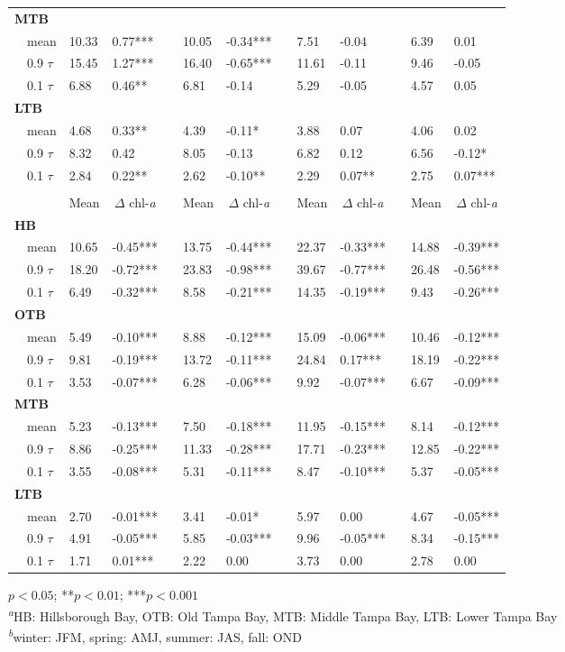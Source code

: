 \documentclass{svjour3}\usepackage[]{graphicx}\usepackage[]{color}
\begin{document}
\begin{table}[!tbp]
\begin{center}
\begin{tabular}{lllcllcllcll}
\hline
{\bfseries MTB}&&&&&&&&&&&\tabularnewline
~~mean&10.33& 0.77***&&10.05&-0.34***&& 7.51&-0.04 && 6.39& 0.01 \tabularnewline
~~0.9 $\tau$&15.45& 1.27***&&16.40&-0.65***&&11.61&-0.11 && 9.46&-0.05 \tabularnewline
~~0.1 $\tau$& 6.88& 0.46**&& 6.81&-0.14 && 5.29&-0.05 && 4.57& 0.05 \tabularnewline
\hline
{\bfseries LTB}&&&&&&&&&&&\tabularnewline
~~mean& 4.68& 0.33**&& 4.39&-0.11*&& 3.88& 0.07 && 4.06& 0.02 \tabularnewline
~~0.9 $\tau$& 8.32& 0.42 && 8.05&-0.13 && 6.82& 0.12 && 6.56&-0.12*\tabularnewline
~~0.1 $\tau$& 2.84& 0.22**&& 2.62&-0.10**&& 2.29& 0.07**&& 2.75& 0.07***\tabularnewline
\hline
{\bfseries }&&&&&&&&&&&\tabularnewline
\cline{2-3} \cline{5-6} \cline{8-9} \cline{11-12}
\multicolumn{1}{l}{}&\multicolumn{1}{c}{Mean}&\multicolumn{1}{c}{$\Delta$ chl-\textit{a}}&\multicolumn{1}{c}{}&\multicolumn{1}{c}{Mean}&\multicolumn{1}{c}{$\Delta$ chl-\textit{a}}&\multicolumn{1}{c}{}&\multicolumn{1}{c}{Mean}&\multicolumn{1}{c}{$\Delta$ chl-\textit{a}}&\multicolumn{1}{c}{}&\multicolumn{1}{c}{Mean}&\multicolumn{1}{c}{$\Delta$ chl-\textit{a}}\tabularnewline
\hline
{\bfseries HB}&&&&&&&&&&&\tabularnewline
~~mean&10.65&-0.45***&&13.75&-0.44***&&22.37&-0.33***&&14.88&-0.39***\tabularnewline
~~0.9 $\tau$&18.20&-0.72***&&23.83&-0.98***&&39.67&-0.77***&&26.48&-0.56***\tabularnewline
~~0.1 $\tau$& 6.49&-0.32***&& 8.58&-0.21***&&14.35&-0.19***&& 9.43&-0.26***\tabularnewline
\hline
{\bfseries OTB}&&&&&&&&&&&\tabularnewline
~~mean& 5.49&-0.10***&& 8.88&-0.12***&&15.09&-0.06***&&10.46&-0.12***\tabularnewline
~~0.9 $\tau$& 9.81&-0.19***&&13.72&-0.11***&&24.84& 0.17***&&18.19&-0.22***\tabularnewline
~~0.1 $\tau$& 3.53&-0.07***&& 6.28&-0.06***&& 9.92&-0.07***&& 6.67&-0.09***\tabularnewline
\hline
{\bfseries MTB}&&&&&&&&&&&\tabularnewline
~~mean& 5.23&-0.13***&& 7.50&-0.18***&&11.95&-0.15***&& 8.14&-0.12***\tabularnewline
~~0.9 $\tau$& 8.86&-0.25***&&11.33&-0.28***&&17.71&-0.23***&&12.85&-0.22***\tabularnewline
~~0.1 $\tau$& 3.55&-0.08***&& 5.31&-0.11***&& 8.47&-0.10***&& 5.37&-0.05***\tabularnewline
\hline
{\bfseries LTB}&&&&&&&&&&&\tabularnewline
~~mean& 2.70&-0.01***&& 3.41&-0.01*&& 5.97& 0.00 && 4.67&-0.05***\tabularnewline
~~0.9 $\tau$& 4.91&-0.05***&& 5.85&-0.03***&& 9.96&-0.05***&& 8.34&-0.15***\tabularnewline
~~0.1 $\tau$& 1.71& 0.01***&& 2.22& 0.00 && 3.73& 0.00 && 2.78& 0.00 \tabularnewline
\hline
\end{tabular}\end{center}

\footnotesize *$p<0.05$; **$p<0.01$; ***$p<0.001$\\\textsuperscript{\textit{a}}HB: Hillsborough Bay, OTB: Old Tampa Bay, MTB: Middle Tampa Bay, LTB: Lower Tampa Bay\\\textsuperscript{\textit{b}}winter: JFM, spring: AMJ, summer: JAS, fall: OND\end{table}
\end{document}
